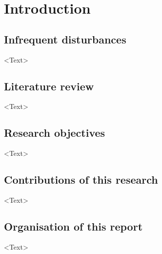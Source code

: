 \chapter*{Introduction}         %
\label{chap-introduction}       %


\section*{Infrequent disturbances}

<Text>


\section*{Literature review}

<Text>


\section*{Research objectives}

<Text>


\section*{Contributions of this research}

<Text>


\section*{Organisation of this report}

<Text>
